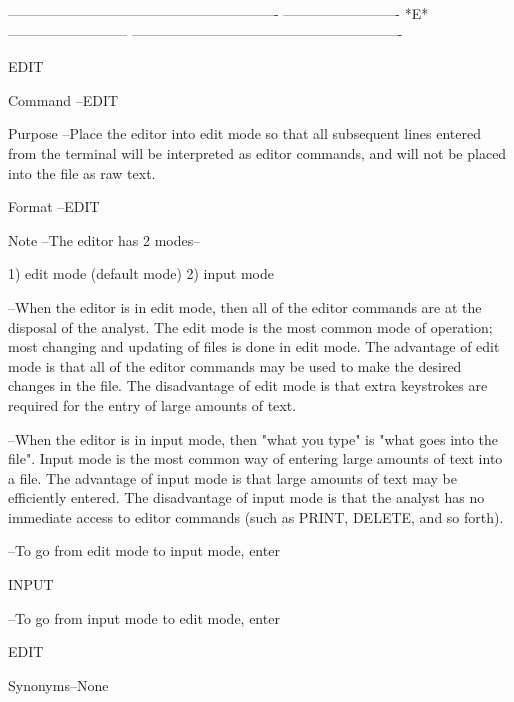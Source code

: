  
 
 
 
 
 
 
 
 
 
 
 
----------------------------------------------------------
-------------------------  *E*  --------------------------
----------------------------------------------------------
 
EDIT
 
Command --EDIT
 
Purpose --Place the editor into    edit mode
          so that all subsequent lines entered
          from the terminal will be interpreted
          as editor commands, and will not be
          placed into the file as raw text.
 
Format  --EDIT
 
Note    --The editor has 2 modes--
 
             1) edit  mode (default mode)
             2) input mode
 
        --When the editor is in    edit mode,
          then all of the editor commands are
          at the disposal of the analyst.
          The     edit mode    is the most common
          mode of operation; most changing and updating
          of files is done in    edit mode.
          The advantage of    edit mode   is that
          all of the editor commands may be used to
          make the desired changes in the file.
          The disadvantage of    edit mode is that
          extra keystrokes are required for the entry
          of large amounts of text.
 
        --When the editor is in    input mode,
          then "what you type" is "what goes into
          the file".  Input mode   is the most
          common way of entering large amounts
          of text into a file.
          The advantage of    input mode   is that
          large amounts of text may be efficiently
          entered.   The disadvantage of    input mode
          is that the analyst has no immediate access
          to editor commands (such as PRINT, DELETE,
          and so forth).
 
        --To go from edit mode to input mode, enter
 
             INPUT
 
        --To go from input mode to edit mode, enter
 
             EDIT
 
Synonyms--None
 
